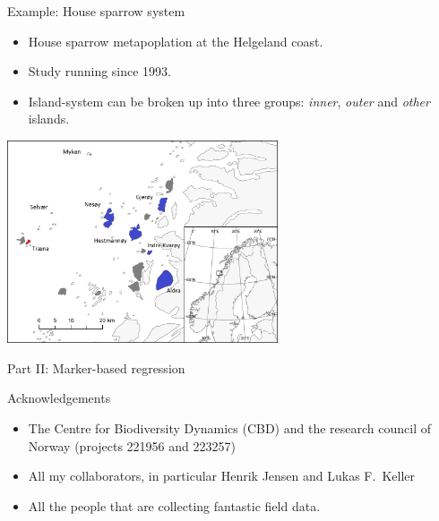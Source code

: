 \documentclass[10pt,ignorenonframetext,]{beamer}
\providecommand{\tightlist}{%
  \setlength{\itemsep}{0pt}\setlength{\parskip}{0pt}}
\begin{document}
\begin{frame}

\begin{block}{Example: House sparrow system}

\vspace{2mm}

\begin{itemize}
\tightlist
\item
  House sparrow metapoplation at the Helgeland coast.
\end{itemize}

\vspace{2mm}

\begin{itemize}
\tightlist
\item
  Study running since 1993.
\end{itemize}

\vspace{2mm}

\begin{itemize}
\tightlist
\item
  Island-system can be broken up into three groups: \emph{inner},
  \emph{outer} and \emph{other} islands.
\end{itemize}

\vspace{3mm}

\center
\includegraphics[width=0.6\textwidth,height=\textheight]{graphics/Helgeland.png}

\end{block}

\end{frame}

\begin{frame}{Part II: Marker-based regression}
\protect\hypertarget{part-ii-marker-based-regression}{}

\end{frame}

\begin{frame}{Acknowledgements}
\protect\hypertarget{acknowledgements}{}

\begin{itemize}
\item
  The Centre for Biodiversity Dynamics (CBD) and the research council of
  Norway (projects 221956 and 223257)
\item
  All my collaborators, in particular Henrik Jensen and Lukas F.~Keller
\item
  All the people that are collecting fantastic field data.
\end{itemize}

\end{frame}
\end{document}
